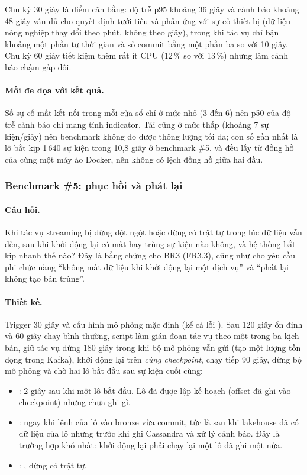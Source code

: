Chu kỳ 30 giây là điểm cân bằng: độ trễ p95 khoảng 36 giây và cảnh báo khoảng 48 giây vẫn đủ cho quyết định tưới tiêu và phản ứng với sự cố thiết bị (dữ liệu nông nghiệp thay đổi theo phút, không theo giây), trong khi tác vụ chỉ bận khoảng một phần tư thời gian và số commit bằng một phần ba so với 10 giây. Chu kỳ 60 giây tiết kiệm thêm rất ít CPU (12\,\% so với 13\,\%) nhưng làm cảnh báo chậm gấp đôi.

\paragraph{Mối đe dọa với kết quả.} Số sự cố mất kết nối trong mỗi cửa sổ chỉ ở mức nhỏ (3 đến 6) nên p50 của độ trễ cảnh báo chỉ mang tính indicator. Tải cũng ở mức thấp (khoảng 7 sự kiện/giây) nên benchmark không đo được thông lượng tối đa; con số gần nhất là lô bắt kịp 1\,640 sự kiện trong 10,8 giây ở benchmark \#5.  và  đều lấy từ đồng hồ của cùng một máy ảo Docker, nên không có lệch đồng hồ giữa hai đầu.

\subsubsection{Benchmark \#5: phục hồi và phát lại}
\label{sec:5-bench-replay}

\paragraph{Câu hỏi.} Khi tác vụ streaming bị dừng đột ngột hoặc dừng có trật tự trong lúc dữ liệu vẫn đến, sau khi khởi động lại có mất hay trùng sự kiện nào không, và hệ thống bắt kịp nhanh thế nào? Đây là bằng chứng cho BR3 (FR3.3), cũng như cho yêu cầu phi chức năng ``không mất dữ liệu khi khởi động lại một dịch vụ'' và ``phát lại không tạo bản trùng''.

\paragraph{Thiết kế.} Trigger 30 giây và cấu hình mô phỏng mặc định (kể cả lỗi ). Sau 120 giây ổn định và 60 giây chạy bình thường, script làm gián đoạn tác vụ theo một trong ba kịch bản, giữ tác vụ dừng 180 giây trong khi bộ mô phỏng vẫn gửi (tạo một lượng tồn đọng trong Kafka), khởi động lại trên \emph{cùng checkpoint}, chạy tiếp 90 giây, dừng bộ mô phỏng và chờ hai lô bắt đầu sau sự kiện cuối cùng:

\begin{itemize}
  \item {}:  2 giây sau khi một lô bắt đầu. Lô đã được lập kế hoạch (offset đã ghi vào checkpoint) nhưng chưa ghi gì.
  \item {}:  ngay khi lệnh  của lô vào bronze vừa commit, tức là sau khi lakehouse đã có dữ liệu của lô nhưng trước khi ghi Cassandra và xử lý cảnh báo. Đây là trường hợp khó nhất: khởi động lại phải chạy lại một lô đã ghi một nửa.
  \item {}: , dừng có trật tự.
\end{itemize}

